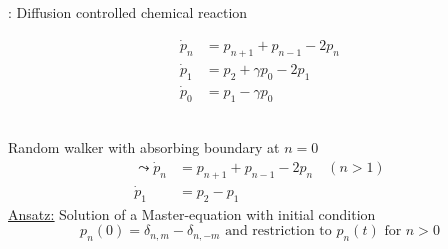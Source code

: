\underline{}: Diffusion controlled chemical reaction
\begin{figure}[H]
	\centering
	\begin{multicols}{2}
		\begin{align*}
			\dot{p}_n&=p_{n+1}+p_{n-1}-2p_n\\
			\dot{p}_1&=p_2+\gamma p_0-2p_1\\
			\dot{p}_0&=p_1-\gamma p_0
		\end{align*}
		\columnbreak
		\begin{figure}[H]
			\centering
		\end{figure}
	\end{multicols}	
\end{figure}
\noindent\textbf{\underline{}}\vspace{0.2cm}\\
Random walker with absorbing boundary at $n=0$
\begin{align*}
	\leadsto \dot{p}_n&=p_{n+1}+p_{n-1}-2p_n \quad (n>1)\\
	\dot{p}_1&=p_2-p_1
\end{align*}
\underline{\underline{Ansatz:}} Solution of a Master-equation with initial condition
\begin{equation*}
	p_n(0)=\delta_{n,m}-\delta_{n,-m} \text{ and restriction to } p_n(t) \text{ for } n>0
\end{equation*}
